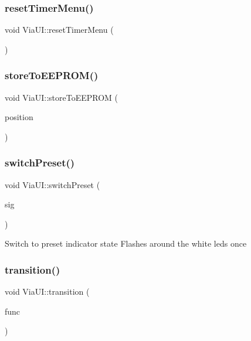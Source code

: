 \subsubsection{\texorpdfstring{reset\+Timer\+Menu()}{resetTimerMenu()}}
{\footnotesize\ttfamily void Via\+U\+I\+::reset\+Timer\+Menu (\begin{DoxyParamCaption}\item[{void}]{ }\end{DoxyParamCaption})\hspace{0.3cm}{\ttfamily [inline]}}

\mbox{\label{class_via_u_i_a09fbb5e879fb9e2e77c4642dae4ab83a}} 
\subsubsection{\texorpdfstring{store\+To\+E\+E\+P\+R\+O\+M()}{storeToEEPROM()}}
{\footnotesize\ttfamily void Via\+U\+I\+::store\+To\+E\+E\+P\+R\+OM (\begin{DoxyParamCaption}\item[{int32\+\_\+t}]{position }\end{DoxyParamCaption})}

\mbox{\label{class_via_u_i_af3a811550d54835d446c425dc57fa157}} 
\subsubsection{\texorpdfstring{switch\+Preset()}{switchPreset()}}
{\footnotesize\ttfamily void Via\+U\+I\+::switch\+Preset (\begin{DoxyParamCaption}\item[{int32\+\_\+t}]{sig }\end{DoxyParamCaption})}

Switch to preset indicator state Flashes around the white leds once \mbox{\label{class_via_u_i_a99373a450c4c494a6261edbfc3b21fd9}} 
\subsubsection{\texorpdfstring{transition()}{transition()}}
{\footnotesize\ttfamily void Via\+U\+I\+::transition (\begin{DoxyParamCaption}\item[{void(Via\+U\+I\+::$\ast$)(int32\+\_\+t)}]{func }\end{DoxyParamCaption})\hspace{0.3cm}{\ttfamily [virtual]}}

